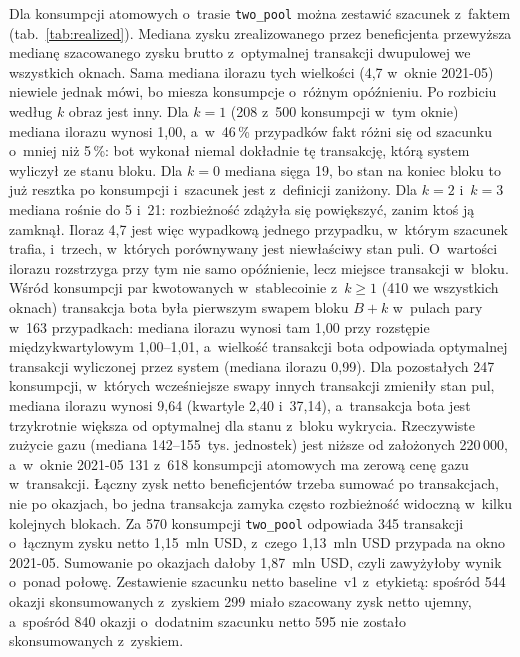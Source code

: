 Dla konsumpcji atomowych o~trasie \texttt{two\_pool} można zestawić szacunek z~faktem
(tab.~\ref{tab:realized}). Mediana zysku zrealizowanego przez beneficjenta przewyższa medianę
szacowanego zysku brutto z~optymalnej transakcji dwupulowej we wszystkich oknach. Sama mediana
ilorazu tych wielkości (4,7 w~oknie 2021-05) niewiele jednak mówi, bo miesza konsumpcje o~różnym
opóźnieniu. Po rozbiciu według $k$ obraz jest inny. Dla $k=1$ (208 z~500 konsumpcji w~tym oknie)
mediana ilorazu wynosi 1,00, a~w~46\,\% przypadków fakt różni się od szacunku o~mniej niż
5\,\%: bot wykonał niemal dokładnie tę transakcję, którą system wyliczył ze stanu bloku. Dla
$k=0$ mediana sięga 19, bo stan na koniec bloku to już resztka po konsumpcji i~szacunek jest
z~definicji zaniżony. Dla $k=2$ i~$k=3$ mediana rośnie do 5 i~21: rozbieżność zdążyła się
powiększyć, zanim ktoś ją zamknął. Iloraz 4,7 jest więc wypadkową jednego przypadku, w~którym
szacunek trafia, i~trzech, w~których porównywany jest niewłaściwy stan puli.
O~wartości ilorazu rozstrzyga przy tym nie samo opóźnienie, lecz miejsce transakcji w~bloku.
Wśród konsumpcji par kwotowanych w~stablecoinie z~$k\ge1$ (410 we wszystkich oknach) transakcja
bota była pierwszym swapem bloku $B+k$ w~pulach pary w~163 przypadkach: mediana ilorazu wynosi tam
1,00 przy rozstępie międzykwartylowym 1,00--1,01, a~wielkość transakcji bota odpowiada optymalnej
transakcji wyliczonej przez system (mediana ilorazu 0,99). Dla pozostałych 247 konsumpcji,
w~których wcześniejsze swapy innych transakcji zmieniły stan pul, mediana ilorazu wynosi 9,64
(kwartyle 2,40 i~37,14), a~transakcja bota jest trzykrotnie większa od optymalnej dla stanu
z~bloku wykrycia.
Rzeczywiste zużycie gazu (mediana
142--155~tys. jednostek) jest niższe od założonych 220\,000, a~w~oknie 2021-05 131 z~618
konsumpcji atomowych ma zerową cenę gazu w~transakcji. Łączny zysk netto beneficjentów trzeba
sumować po transakcjach, nie po okazjach, bo jedna transakcja zamyka często rozbieżność widoczną
w~kilku kolejnych blokach. Za 570 konsumpcji \texttt{two\_pool} odpowiada 345 transakcji o~łącznym
zysku netto 1,15~mln USD, z~czego 1,13~mln USD przypada na okno 2021-05. Sumowanie po okazjach
dałoby 1,87~mln USD, czyli zawyżyłoby wynik o~ponad połowę.
Zestawienie szacunku netto baseline~v1 z~etykietą: spośród 544 okazji skonsumowanych z~zyskiem
299 miało szacowany zysk netto ujemny, a~spośród 840 okazji o~dodatnim szacunku netto 595 nie
zostało skonsumowanych z~zyskiem.

